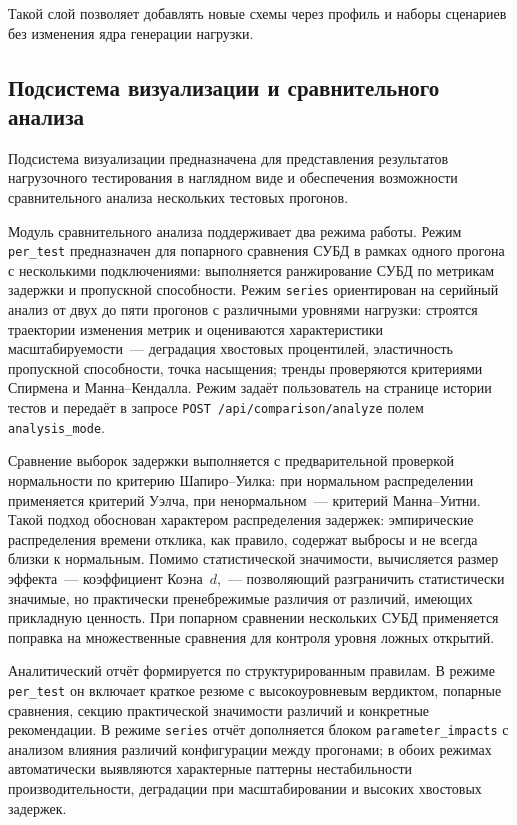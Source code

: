 Такой слой позволяет добавлять новые схемы через профиль и наборы сценариев без изменения ядра генерации нагрузки.

\subsection{Подсистема визуализации и сравнительного анализа}

Подсистема визуализации предназначена для представления результатов нагрузочного тестирования в наглядном виде и обеспечения возможности сравнительного анализа нескольких тестовых прогонов.

Модуль сравнительного анализа поддерживает два режима работы. Режим \texttt{per\_test} предназначен для попарного сравнения СУБД в рамках одного прогона с несколькими подключениями: выполняется ранжирование СУБД по метрикам задержки и пропускной способности. Режим \texttt{series} ориентирован на серийный анализ от двух до пяти прогонов с различными уровнями нагрузки: строятся траектории изменения метрик и оцениваются характеристики масштабируемости~--- деградация хвостовых процентилей, эластичность пропускной способности, точка насыщения; тренды проверяются критериями Спирмена и Манна--Кендалла. Режим задаёт пользователь на странице истории тестов и передаёт в запросе \texttt{POST /api/comparison/analyze} полем \texttt{analysis\_mode}.

Сравнение выборок задержки выполняется с предварительной проверкой нормальности по критерию Шапиро--Уилка: при нормальном распределении применяется критерий Уэлча, при ненормальном~--- критерий Манна--Уитни. Такой подход обоснован характером распределения задержек: эмпирические распределения времени отклика, как правило, содержат выбросы и не всегда близки к нормальным. Помимо статистической значимости, вычисляется размер эффекта~--- коэффициент Коэна~$d$,~--- позволяющий разграничить статистически значимые, но практически пренебрежимые различия от различий, имеющих прикладную ценность. При попарном сравнении нескольких СУБД применяется поправка на множественные сравнения для контроля уровня ложных открытий.

Аналитический отчёт формируется по структурированным правилам. В режиме \texttt{per\_test} он включает краткое резюме с высокоуровневым вердиктом, попарные сравнения, секцию практической значимости различий и конкретные рекомендации. В режиме \texttt{series} отчёт дополняется блоком \texttt{parameter\_impacts} с анализом влияния различий конфигурации между прогонами; в обоих режимах автоматически выявляются характерные паттерны нестабильности производительности, деградации при масштабировании и высоких хвостовых задержек.

